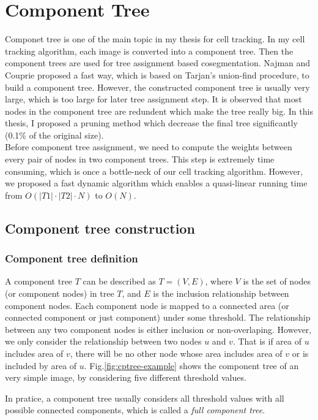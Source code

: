 \chapter{Component Tree}\label{chapter:cptree} \label{chpt:cptree}
Componet tree is one of the main topic in my thesis for cell tracking. In my cell tracking algorithm, each image is converted into a component tree. Then the component trees are used for tree assignment based cosegmentation. Najman and Couprie \cite{Najman:04,najman2006building} proposed a fast way, which is based on Tarjan's union-find procedure, to build a component tree. However, the constructed component tree is usually very large, which is too large for later tree assignment step. It is observed that most nodes in the component tree are redundent which make the tree really big. In this thesis, I proposed a pruning method which decrease the final tree significantly (0.1\% of the original size).\\
Before component tree assignment, we need to compute the weights between every pair of nodes in two component trees. This step is extremely time consuming, which is once a bottle-neck of our cell tracking algorithm. However, we proposed a fast dynamic algorithm which enables a quasi-linear running time from $O(|T1|\cdot|T2|\cdot N)$ to $O(N)$.
\section{Component tree construction}
\subsection{Component tree definition}
A component tree $T$ can be described as $T=(V, E)$, where $V$ is the set of nodes (or component nodes) in tree $T$, and $E$ is the inclusion relationship between component nodes. Each component node is mapped to a connected area (or connected component or just component) under some threshold. The relationship between any two component nodes is either inclusion or non-overlaping. However, we only consider the relationship between two nodes $u$ and $v$. That is if area of $u$ includes area of $v$, there will be no other node whose area includes area of $v$ or is included by area of $u$. Fig.\ref{fig:cptree-example} shows the component tree of an very simple image, by considering five different threshold values.

In pratice, a component tree usually considers all threshold values with all possible connected components, which is called a \emph{full component tree}.

